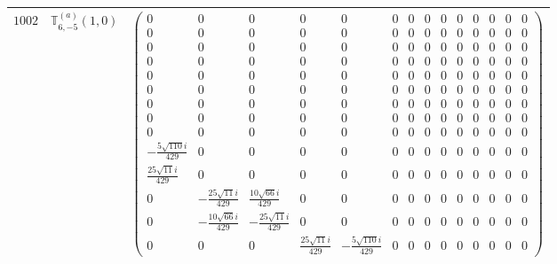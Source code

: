 \documentclass[fleqn,8pt,landscape]{jsarticle}
\begin{document}
\begin{center}
\begin{longtable}{ccc}
$ 1002 $ & $ \mathbb{T}_{6,-5}^{(a)}(1,0) $ & $ \begin{pmatrix} 0 & 0 & 0 & 0 & 0 & 0 & 0 & 0 & 0 & 0 & 0 & 0 & 0 & 0 \\ 0 & 0 & 0 & 0 & 0 & 0 & 0 & 0 & 0 & 0 & 0 & 0 & 0 & 0 \\ 0 & 0 & 0 & 0 & 0 & 0 & 0 & 0 & 0 & 0 & 0 & 0 & 0 & 0 \\ 0 & 0 & 0 & 0 & 0 & 0 & 0 & 0 & 0 & 0 & 0 & 0 & 0 & 0 \\ 0 & 0 & 0 & 0 & 0 & 0 & 0 & 0 & 0 & 0 & 0 & 0 & 0 & 0 \\ 0 & 0 & 0 & 0 & 0 & 0 & 0 & 0 & 0 & 0 & 0 & 0 & 0 & 0 \\ 0 & 0 & 0 & 0 & 0 & 0 & 0 & 0 & 0 & 0 & 0 & 0 & 0 & 0 \\ 0 & 0 & 0 & 0 & 0 & 0 & 0 & 0 & 0 & 0 & 0 & 0 & 0 & 0 \\ 0 & 0 & 0 & 0 & 0 & 0 & 0 & 0 & 0 & 0 & 0 & 0 & 0 & 0 \\ - \frac{5 \sqrt{110} i}{429} & 0 & 0 & 0 & 0 & 0 & 0 & 0 & 0 & 0 & 0 & 0 & 0 & 0 \\ \frac{25 \sqrt{11} i}{429} & 0 & 0 & 0 & 0 & 0 & 0 & 0 & 0 & 0 & 0 & 0 & 0 & 0 \\ 0 & - \frac{25 \sqrt{11} i}{429} & \frac{10 \sqrt{66} i}{429} & 0 & 0 & 0 & 0 & 0 & 0 & 0 & 0 & 0 & 0 & 0 \\ 0 & - \frac{10 \sqrt{66} i}{429} & - \frac{25 \sqrt{11} i}{429} & 0 & 0 & 0 & 0 & 0 & 0 & 0 & 0 & 0 & 0 & 0 \\ 0 & 0 & 0 & \frac{25 \sqrt{11} i}{429} & - \frac{5 \sqrt{110} i}{429} & 0 & 0 & 0 & 0 & 0 & 0 & 0 & 0 & 0 \end{pmatrix} $ \\ \hline

\end{longtable}
\end{center}
\end{document}

